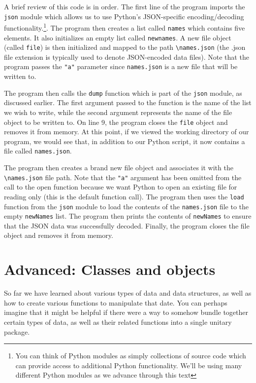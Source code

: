 \documentclass{book}
\begin{document}
A brief review of this code is in order. The first line of the program imports the \texttt{json} module which allows us to use Python's JSON-specific encoding/decoding functionality.\footnote{You can think of Python modules as simply collections of source code which can provide access to additional Python functionality. We'll be using many different Python modules as we advance through this text}. The program then creates a list called \texttt{names} which contains five elements. It also initializes an empty list called \texttt{newnames}. A new file object (called \texttt{file}) is then initialized and mapped to the path \texttt{\textbackslash names.json} (the .json file extension is typically used to denote JSON-encoded data files). Note that the program passes the \texttt{"a"} parameter since \texttt{names.json} is a new file that will be written to.

The program then calls the \texttt{dump} function which is part of the \texttt{json} module, as discussed earlier. The first argument passed to the function is the name of the list we wish to write, while the second argument represents the name of the file object to be written to. On line 9, the program closes the \texttt{file} object and removes it from memory. At this point, if we viewed the working directory of our program, we would see that, in addition to our Python script, it now contains a file called \texttt{names.json}.

The program then creates a brand new file object and associates it with the \texttt{\textbackslash names.json} file path. Note that the \texttt{"a"} argument has been omitted from the call to the open function because we want Python to open an existing file for reading only (this is the default function call). The program then uses the \texttt{load} function from the \texttt{json} module to load the contents of the \texttt{names.json} file to the empty \texttt{newNames} list. The program then prints the contents of \texttt{newNames} to ensure that the JSON data was successfully decoded. Finally, the program closes the file object and removes it from memory.

\section{Advanced: Classes and objects}

So far we have learned about various types of data and data structures, as well as how to create various functions to manipulate that date. You can perhaps imagine that it might be helpful if there were a way to somehow bundle together certain types of data, as well as their related functions into a single unitary package. 
\end{document}
